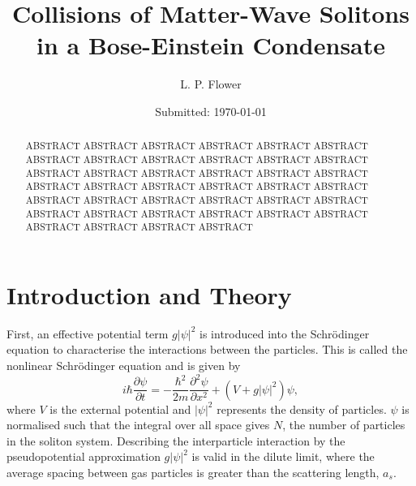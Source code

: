 \documentclass[10pt, twocolumn]{revtex4}    %
\begin{document}
                     


\title{Collisions of Matter-Wave Solitons in a Bose-Einstein Condensate} 
\date{Submitted: \today{}}
\author{L. P. Flower}

\begin{abstract}              
 
ABSTRACT ABSTRACT ABSTRACT ABSTRACT ABSTRACT ABSTRACT ABSTRACT ABSTRACT ABSTRACT ABSTRACT ABSTRACT ABSTRACT ABSTRACT ABSTRACT ABSTRACT ABSTRACT ABSTRACT ABSTRACT ABSTRACT ABSTRACT ABSTRACT ABSTRACT ABSTRACT ABSTRACT ABSTRACT ABSTRACT ABSTRACT ABSTRACT ABSTRACT ABSTRACT ABSTRACT ABSTRACT ABSTRACT ABSTRACT ABSTRACT ABSTRACT ABSTRACT ABSTRACT ABSTRACT ABSTRACT 

\end{abstract}

\maketitle
\thispagestyle{plain} %



\section{Introduction and Theory} \label{Intro}

First, an effective potential term $g |\psi|^2$  is introduced into the Schr\"{o}dinger equation to characterise the interactions between the particles. This is called the nonlinear Schr\"{o}dinger equation and is given by 
\begin{equation} \label{NLSE}
i \hbar \frac{\partial \psi}{\partial t} = -\frac{\hbar^2}{2m} \frac{\partial^2 \psi}{\partial x^2} + (V+g |\psi|^2) \psi,
\end{equation}
where $V$ is the external potential and $|\psi|^2$ represents the density of particles. $\psi$ is normalised such that the integral over all space gives $N$, the number of particles in the soliton system. Describing the interparticle interaction by the pseudopotential approximation $g |\psi|^2$ is valid in the dilute limit, where the average spacing between gas particles is greater than the scattering length, $a_s$. 
\end{document}
